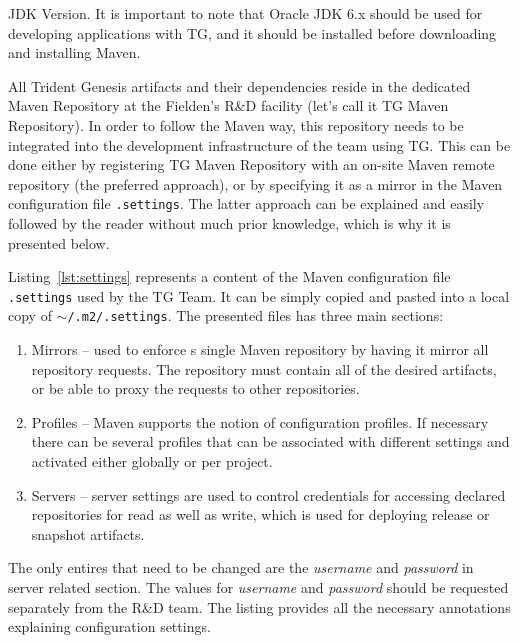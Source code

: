   \begin{notebox}{JDK Version.}{\label{mb:java}}
    It is important to note that Oracle JDK 6.x should be used for developing applications with TG, and it should be installed before downloading and installing Maven. 
  \end{notebox}
  
  All Trident Genesis artifacts and their dependencies reside in the dedicated Maven Repository at the Fielden's R\&D facility (let's call it TG Maven Repository).
  In order to follow the Maven way, this repository needs to be integrated into the development infrastructure of the team using TG.
  This can be done either by registering TG Maven Repository with an on-site Maven remote repository (the preferred approach), or by specifying it as a mirror in the Maven configuration file \texttt{.settings}.
  The latter approach can be explained and easily followed by the reader without much prior knowledge, which is why it is presented below.
  
  Listing~\ref{lst:settings} represents a content of the Maven configuration file \texttt{.settings} used by the TG Team.
  It can be simply copied and pasted into a local copy of \texttt{$\sim$/.m2/.settings}.
  The presented files has three main sections:
  \begin{enumerate}
    \item Mirrors -- used to enforce s single Maven repository by having it mirror all repository requests. 
	  The repository must contain all of the desired artifacts, or be able to proxy the requests to other repositories.
    \item Profiles -- Maven supports the notion of configuration profiles. 
	  If necessary there can be several profiles that can be associated with different settings and activated either globally or per project.
    \item Servers -- server settings are used to control credentials for accessing declared repositories for read as well as write, which is used for deploying release or snapshot artifacts.
  \end{enumerate}
  The only entires that need to be changed are the \emph{username} and \emph{password} in server related section.
  The values for \emph{username} and \emph{password}  should be requested separately from the R\&D team.
  The listing provides all the necessary annotations explaining configuration settings.
  
